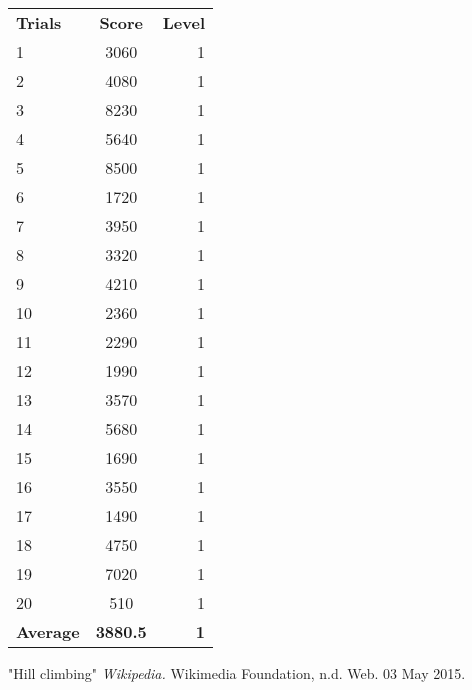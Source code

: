 \documentclass[a4paper,oneside,10pt]{report}
\begin{document}
\begin{table}[h]
\centering
\begin{tabular}{ l | c | r }
\textbf{Trials} & \textbf{Score} & \textbf{Level}\\
1&	3060&	1\\
2&	4080&	1\\
3&	8230&	1\\
4&	5640&	1\\
5&	8500&	1\\
6&	1720&	1\\
7&	3950&	1\\
8&	3320&	1\\
9&	4210&	1\\
10&	2360&	1\\
11&	2290&	1\\
12&	1990&	1\\
13&	3570&	1\\
14&	5680&	1\\
15&	1690&	1\\
16&	3550&	1\\
17&	1490&	1\\
18&	4750&	1\\
19&	7020&	1\\
20&	510&	1\\
\textbf{Average}&	\textbf{3880.5}& \textbf{1}\\
\end{tabular}
\end{table}



\clearpage
{}
\begin{thebibliography}{9}

"Hill climbing"
\textit{Wikipedia.} 
 Wikimedia Foundation, n.d. Web. 03 May 2015.

\end{thebibliography}

\appendix
\end{document}
